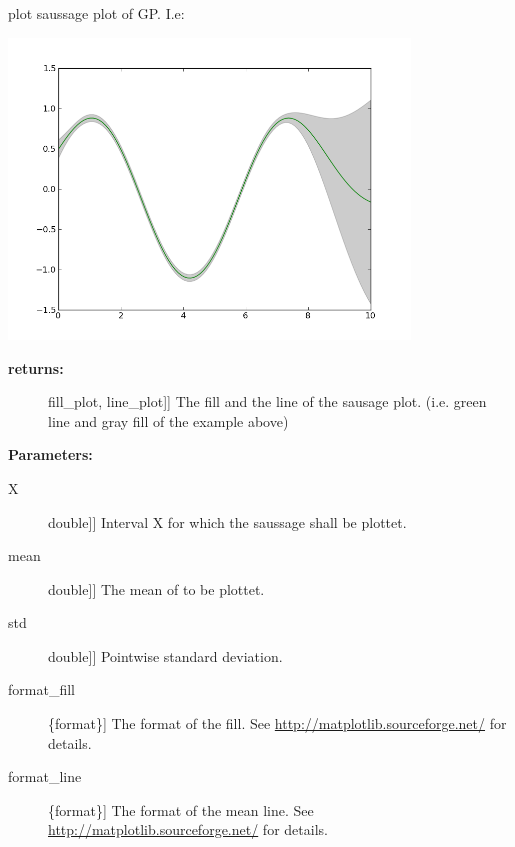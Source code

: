 \documentclass[letterpaper,10pt,english]{sphinxmanual}
\begin{document}
\begin{fulllineitems}
\label{plot_gpr:pygp.plot.gpr_plot.plot_sausage}
plot saussage plot of GP. I.e:

\includegraphics[height=8cm]{sausage.png}
\begin{description}
\item[{\textbf{returns:}}] \leavevmode{[}{[}fill\_plot, line\_plot{]}{]}
The fill and the line of the sausage plot. (i.e. green line and gray fill of the example above)

\end{description}

\textbf{Parameters:}
\begin{description}
\item[{X}] \leavevmode{[}{[}double{]}{]}
Interval X for which the saussage shall be plottet.

\item[{mean}] \leavevmode{[}{[}double{]}{]}
The mean of to be plottet.

\item[{std}] \leavevmode{[}{[}double{]}{]}
Pointwise standard deviation.

\item[{format\_fill}] \leavevmode{[}\{format\}{]}
The format of the fill. See \href{http://matplotlib.sourceforge.net/}{http://matplotlib.sourceforge.net/} for details.

\item[{format\_line}] \leavevmode{[}\{format\}{]}
The format of the mean line. See \href{http://matplotlib.sourceforge.net/}{http://matplotlib.sourceforge.net/} for details.

\end{description}

\end{fulllineitems}
\end{document}
